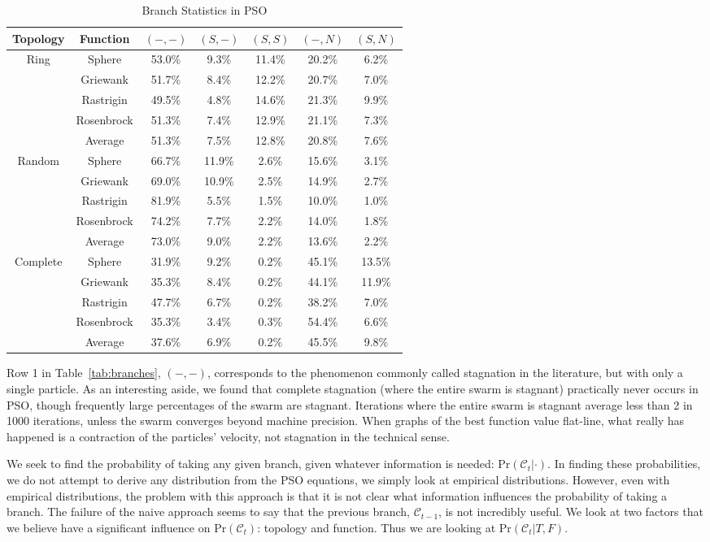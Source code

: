 \documentclass[smallcondensed]{svjour3}
\providecommand{\caseset}{\ensuremath{\mathcal{C}}}
\providecommand{\casexn}{\ensuremath{(S,-)}}
\providecommand{\casexx}{\ensuremath{(S,S)}}
\providecommand{\casepn}{\ensuremath{(-,-)}}
\providecommand{\casepN}{\ensuremath{(-,N)}}
\providecommand{\casexN}{\ensuremath{(S,N)}}
\providecommand{\prob}{\ensuremath{\mathrm{Pr}}}
\begin{document}
\begin{table}[ht]
  \caption{Branch Statistics in PSO}
  \label{tab:stats}
  \centering
  \scriptsize
  \begin{tabular}{c|c|c|c|c|c|c}
	Topology&Function&\casepn&\casexn&\casexx&\casepN&\casexN\\
	\hline
	\hline
	Ring&Sphere&53.0\%&9.3\%&11.4\%&20.2\%&6.2\%\\
	&Griewank&51.7\%&8.4\%&12.2\%&20.7\%&7.0\%\\
	&Rastrigin&49.5\%&4.8\%&14.6\%&21.3\%&9.9\%\\
	&Rosenbrock&51.3\%&7.4\%&12.9\%&21.1\%&7.3\%\\
	\cline{2-7}
	&Average&{51.3\%}&{7.5\%}&{12.8\%}&{20.8\%}&
	{7.6\%}\\
	\hline
	\hline
	Random&Sphere&66.7\%&11.9\%&2.6\%&15.6\%&3.1\%\\
	&Griewank&69.0\%&10.9\%&2.5\%&14.9\%&2.7\%\\
	&Rastrigin&81.9\%&5.5\%&1.5\%&10.0\%&1.0\%\\
	&Rosenbrock&74.2\%&7.7\%&2.2\%&14.0\%&1.8\%\\
	\cline{2-7}
	&Average&{73.0\%}&{9.0\%}&{2.2\%}&{13.6\%}&
	{2.2\%}\\
	\hline
	\hline
	Complete&Sphere&31.9\%&9.2\%&0.2\%&45.1\%&13.5\%\\
	&Griewank&35.3\%&8.4\%&0.2\%&44.1\%&11.9\%\\
	&Rastrigin&47.7\%&6.7\%&0.2\%&38.2\%&7.0\%\\
	&Rosenbrock&35.3\%&3.4\%&0.3\%&54.4\%&6.6\%\\
	\cline{2-7}
	&Average&{37.6\%}&{6.9\%}&{0.2\%}&{45.5\%}&
	{9.8\%}\\
	\hline
  \end{tabular}
\end{table}

Row 1 in Table~\ref{tab:branches}, \casepn, corresponds to the phenomenon
commonly called stagnation in the literature, but with only a single particle.
As an interesting aside, we found that complete stagnation (where the entire
swarm is stagnant) practically never occurs in PSO, though frequently large
percentages of the swarm are stagnant.  Iterations where the entire swarm is
stagnant average less than 2 in 1000 iterations, unless the swarm converges
beyond machine precision.  When graphs of the best function value flat-line,
what really has happened is a contraction of the particles' velocity, not
stagnation in the technical sense.  

We seek to find the probability of taking any given branch, given whatever
information is needed: $\prob(\caseset_t|\cdot)$.  In finding these
probabilities, we do not attempt to derive any distribution from the PSO
equations, we simply look at empirical distributions.  However, even with
empirical distributions, the problem with this approach is that it is not clear
what information influences the probability of taking a branch.  The failure of
the naive approach seems to say that the previous branch, $\caseset_{t-1}$, is
not incredibly useful.  We look at two factors that we believe have a
significant influence on $\prob(\caseset_t)$: topology and function.  Thus we
are looking at $\prob(\caseset_t|T,F)$.
\end{document}
